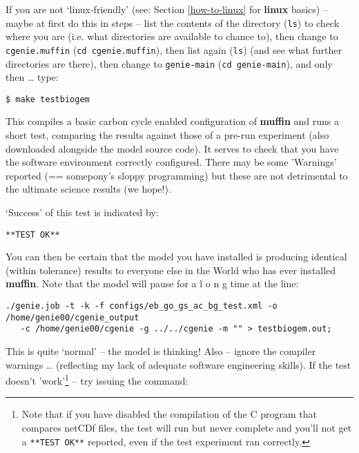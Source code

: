 \documentclass[11pt,fleqn]{book} %
\begin{document}
\noindent If you are not ‘linux-friendly’ (see: Section \ref{how-to-linux} for \textbf{linux} basics) – maybe at first do this in steps – list the contents of the directory (\texttt{ls}) to check where you are (i.e. what directories are available to chance to), then change to \texttt{cgenie.muffin} (\texttt{cd cgenie.muffin}), then list again (\texttt{ls}) (and see what further directories are there), then change to \texttt{genie-main} (\texttt{cd genie-main}), and only then … type:

\vspace{-2mm}
\begin{verbatim}
$ make testbiogem
\end{verbatim}
\vspace{-2mm}

\noindent This compiles a basic carbon cycle enabled configuration of \textbf{muffin} and runs a short test, comparing the results against those of a pre-run experiment (also downloaded alongside the model source code). It serves to check that you have the software environment correctly configured. There may be some ’Warnings’ reported (== somepony’s sloppy programming) but these are not detrimental to the ultimate science results (we hope!).

‘Success’ of this test is indicated by:

\vspace{-2mm}
\begin{verbatim}
**TEST OK**
\end{verbatim}
\vspace{-2mm}

\noindent You can then be certain that the model you have installed is producing identical (within tolerance) results to everyone else in the World who has ever installed \textbf{muffin}. Note that the model will pause for a l o n g time at the line: 

\vspace{-2mm}
\small
\begin{verbatim}
./genie.job -t -k -f configs/eb_go_gs_ac_bg_test.xml -o /home/genie00/cgenie_output
   -c /home/genie00/cgenie -g ../../cgenie -m "" > testbiogem.out;
\end{verbatim}
\normalsize
\vspace{-2mm}

\noindent This is quite ‘normal’ – the model is thinking! Also -- ignore the compiler warnings … (reflecting my lack of adequate software engineering skills). If the test doesn't 'work'\footnote{Note that if you have disabled the compilation of the C program that compares netCDf files, the test will run but never complete and you'll not get a \texttt{**TEST OK**} reported, even if the test experiment ran correctly.} -- try issuing the command:
\end{document}
